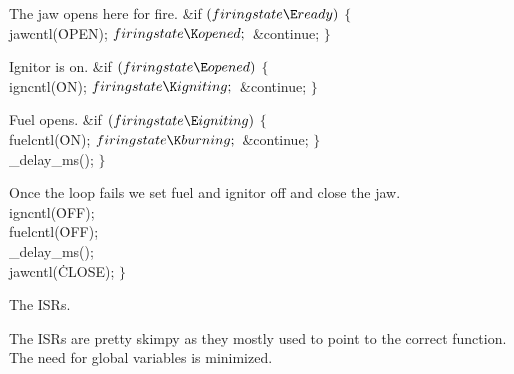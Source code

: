 The jaw opens here for fire.
\Y\B\&{if} ${}(\\{firingstate}\E\\{ready}){}$\5
${}\{{}$\1\6
\\{jawcntl}(\.{OPEN});\6
${}\\{firingstate}\K\\{opened};{}$\6
\&{continue};\6
\4${}\}{}$\2\par
\fi

Ignitor is on.
\Y\B\&{if} ${}(\\{firingstate}\E\\{opened}){}$\5
${}\{{}$\1\6
\\{igncntl}(\.{ON});\6
${}\\{firingstate}\K\\{igniting};{}$\6
\&{continue};\6
\4${}\}{}$\2\par
\fi

Fuel opens.
\Y\B\&{if} ${}(\\{firingstate}\E\\{igniting}){}$\5
${}\{{}$\1\6
\\{fuelcntl}(\.{ON});\6
${}\\{firingstate}\K\\{burning};{}$\6
\&{continue};\6
\4${}\}{}$\2\6
\\{\_delay\_ms}(); $\}{}$\par
\fi

Once the loop fails we set fuel and ignitor off and close the jaw.
\Y\B\\{igncntl}(\.{OFF});\6
\\{fuelcntl}(\.{OFF});\6
\\{\_delay\_ms}();\6
\\{jawcntl}(\.{CLOSE}); $\}{}$\par
\fi

The ISRs.

The ISRs are pretty skimpy as they mostly used to point 
to
the correct function.
The need for global variables is minimized.

\fi

